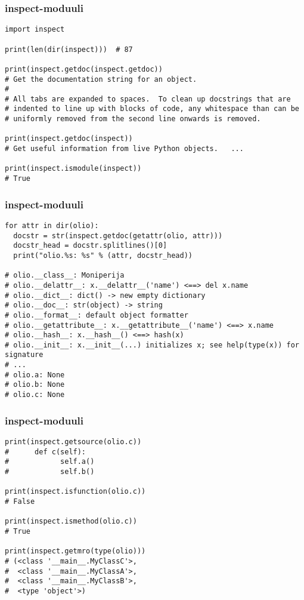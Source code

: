 \documentclass{beamer}
\begin{document}
\begin{frame}[fragile]
\frametitle{inspect-moduuli}
\begin{verbatim}
import inspect

print(len(dir(inspect)))  # 87

print(inspect.getdoc(inspect.getdoc))
# Get the documentation string for an object.
# 
# All tabs are expanded to spaces.  To clean up docstrings that are
# indented to line up with blocks of code, any whitespace than can be
# uniformly removed from the second line onwards is removed.

print(inspect.getdoc(inspect))
# Get useful information from live Python objects.   ...

print(inspect.ismodule(inspect))
# True

\end{verbatim}
\end{frame}

\begin{frame}[fragile]
\frametitle{inspect-moduuli}
\begin{verbatim}
for attr in dir(olio):
  docstr = str(inspect.getdoc(getattr(olio, attr)))
  docstr_head = docstr.splitlines()[0]
  print("olio.%s: %s" % (attr, docstr_head))

# olio.__class__: Moniperija
# olio.__delattr__: x.__delattr__('name') <==> del x.name
# olio.__dict__: dict() -> new empty dictionary
# olio.__doc__: str(object) -> string
# olio.__format__: default object formatter
# olio.__getattribute__: x.__getattribute__('name') <==> x.name
# olio.__hash__: x.__hash__() <==> hash(x)
# olio.__init__: x.__init__(...) initializes x; see help(type(x)) for signature
# ...
# olio.a: None
# olio.b: None
# olio.c: None

\end{verbatim}
\end{frame}

\begin{frame}[fragile]
\frametitle{inspect-moduuli}
\begin{verbatim}
print(inspect.getsource(olio.c))
#      def c(self):
#            self.a()
#            self.b()

print(inspect.isfunction(olio.c))
# False

print(inspect.ismethod(olio.c))
# True

print(inspect.getmro(type(olio)))
# (<class '__main__.MyClassC'>, 
#  <class '__main__.MyClassA'>, 
#  <class '__main__.MyClassB'>, 
#  <type 'object'>)

\end{verbatim}
\end{frame}
\end{document}
